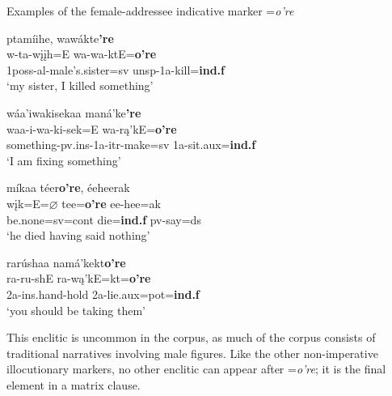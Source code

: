 \begin{exe}

\item\label{oPre} Examples of the female-addressee indicative marker =\textit{o're}

	\begin{xlist}
	
	\item\label{oPre1}
	\glll ptamíihe, wawákte\textbf{'re}\\
	w-ta-wįįh=E wa-wa-ktE=\textbf{o're}\\
	1poss-al-\textnormal{male's.sister}=sv unsp-1a-\textnormal{kill}=\textbf{ind.f}\\
	\glt `my sister, I killed something' \citep[221]{hollow1973a}

	\item\label{oPre2}
	\glll wáa'iwakisekaa maná'ke\textbf{'re}\\
	waa-i-wa-ki-sek=E wa-rą'kE=\textbf{o're}\\
	\textnormal{something}-pv.ins-1a-itr-\textnormal{make}=sv 1a-\textnormal{sit}.aux=\textbf{ind.f}\\
	\glt `I am fixing something' \citep[222]{hollow1973a}

	\item\label{oPre3}
	\glll míkaa téer\textbf{o're}, éeheerak\\
	wįk=E=$\varnothing$ tee=\textbf{o're} ee-hee=ak\\
	\textnormal{be.none}=sv=cont \textnormal{die}=\textbf{ind.f} pv-\textnormal{say}=ds\\
	\glt `he died having said nothing' \citep[63]{hollow1973a}

	\item\label{oPre4}
	\glll rarúshaa namá'kekt\textbf{o're}\\
	ra-ru-shE ra-wą'kE=kt=\textbf{o're}\\
	2a-ins.hand-\textnormal{hold} 2a-\textnormal{lie}.aux=pot=\textbf{ind.f}\\
	\glt `you should be taking them' \citep[75]{hollow1973a}
	
	\end{xlist}

\end{exe}

This enclitic is uncommon in the corpus, as much of the corpus consists of traditional narratives involving male figures. Like the other non-imperative illocutionary markers, no other enclitic can appear after =\textit{o're}; it is the final element in a matrix clause.

